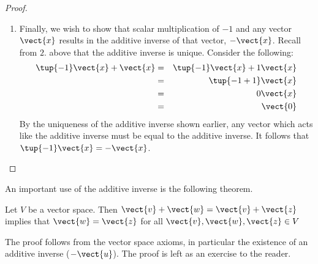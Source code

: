 \begin{proof}
\begin{enumerate}
\item
Finally, we wish to show that scalar multiplication of $-1$ and any vector $\vect{x}$ results in the additive inverse of that vector, $-\vect{x}$. Recall from $2$. above that the additive inverse is unique. 
Consider the following: 
\begin{eqnarray*}
\tup{-1} \vect{x}+\vect{x} & =&\tup{-1} \vect{x}+1\vect{x}\\
&=&\tup{-1+1} \vect{x} \\
&=&0\vect{x} \\
&=&\vect{0}
\end{eqnarray*}
By the uniqueness of the additive inverse shown earlier, any vector which acts like the additive inverse must be equal to the additive inverse. It follows that $\tup{-1} 
\vect{x}=-\vect{x}$.
\end{enumerate}
\end{proof}

An important use of the additive inverse is the following theorem.

\begin{theorem}{}{}
Let $V$ be a vector space. Then $\vect{v} + \vect{w} = \vect{v} + \vect{z}$ implies that $\vect{w} = \vect{z}$ for all $\vect{v}, \vect{w}, \vect{z} \in V$
\end{theorem}

The proof follows from the vector space axioms, in particular the existence of an additive inverse ($-\vect{u}$). The proof is left as an exercise to the reader. 
